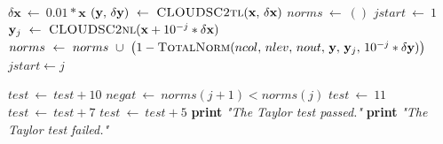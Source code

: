 \documentclass[gmd,manuscript,online]{copernicus}
\begin{document}
\begin{algorithm}[H]
\begin{algorithmic}[1]
			\State $\delta \mathbf{x} ~ \gets ~ 0.01 * \mathbf{x}$
			\State $\left( \mathbf{y}, \, \delta \mathbf{y} \right) ~ \gets ~ \Call{CLOUDSC2tl}{\mathbf{x}, \, \delta \mathbf{x}}$ 
			\State $norms ~ \gets ~ ()$
			\State $jstart ~ \gets ~ 1$
				\State $\mathbf{y}_j ~ \gets ~ \Call{CLOUDSC2nl}{\mathbf{x} + 10^{-j} * \delta \mathbf{x}}$
				\State $norms ~ \gets ~ norms ~ \cup ~ \left( 1 - \Call{TotalNorm}{ncol, \, nlev, \, nout, \, \mathbf{y}, \, \mathbf{y}_j, \, 10^{-j} * \delta \mathbf{y}} \right)$
					\State $jstart \gets j$
				\EndIf
			\EndFor

					\State $test ~ \gets ~ test + 10$
				\EndIf
				\State $negat ~ \gets ~ norms(j+1) < norms(j)$
			\EndFor
				\State $test ~ \gets ~ 11$
			\EndIf
				\State $test ~ \gets ~ test + 7$
			\EndIf
				\State $test ~ \gets ~ test + 5$
			\EndIf
				\State \textbf{print} \emph{"The Taylor test passed."}
			\Else
				\State \textbf{print} \emph{"The Taylor test failed."}
			\EndIf
			\EndProcedure
		\end{algorithmic}
	\end{algorithm}
\end{document}

